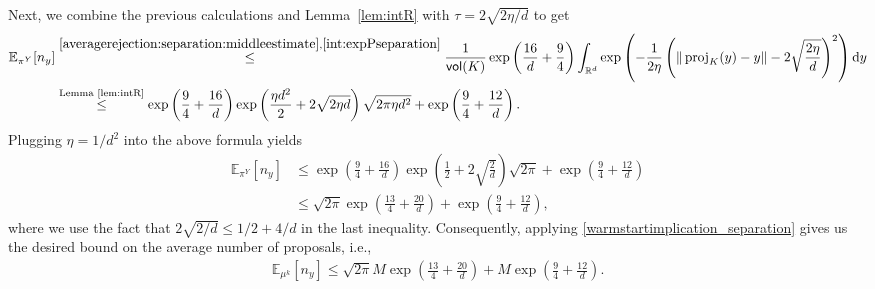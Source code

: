 \documentclass[11pt,letterpaper]{article}
\newcommand{\R}{\mathbb{R}}
\newcommand{\E}{\mathbb{E}}
\newcommand{\proj}{\operatorname{proj}}
\newcommand{\D}{\mathrm{d}}
\newcommand{\vol}{\mathsf{vol}}
\newcommand{\brac}[1]{\left( #1\right)}
\begin{document}
Next, we combine the previous calculations and Lemma~\ref{lem:intR} with $\tau=2\sqrt{2\eta/d}$ to get
\begin{align*}
     \E_{\pi^Y}[n_y]&\stackrel{\eqref{averagerejection:separation:middleestimate},      \eqref{int:expPseparation}}{\leq} \frac{1}{\vol(K)} \exp\brac{\frac{16}{d}+\frac{9}{4}}\int_{\R^d} \exp\left(-\frac{1}{2\eta}\brac{\|\proj_K(y)-y\|-2\sqrt{\frac{2\eta}{d}}}^2\right)\D y\\
     &\stackrel{\text{Lemma~\ref{lem:intR}}}{\le} \exp\brac{\frac{9}{4}+\frac{16}{d}} \exp\left(\frac{\eta d^2}{2}+2\sqrt{2\eta d}\right)\sqrt{2\pi \eta d^2}+\exp\brac{\frac{9}{4}+\frac{12}{d}}. 
\end{align*}
Plugging $\eta=1/d^2$ into the above formula yields
\begin{align*}
     \E_{\pi^Y}[n_y] &\le \exp\brac{\frac{9}{4}+\frac{16}{d}}\exp\brac{\frac{1}{2}+2\sqrt{\frac{2}{d}}}\sqrt{2\pi}+\exp\brac{\frac{9}{4}+\frac{12}{d}}\\
&\le \sqrt{2\pi} \exp\brac{\frac{13}{4}+\frac{20}{d}} + \exp\brac{\frac{9}{4}+\frac{12}{d}},
\end{align*}
where we use the fact that $2\sqrt{2/d} \le 1/2 + 4/d$ in the last inequality.
Consequently, applying \eqref{warmstartimplication_separation} gives us the desired bound on the average number of proposals, i.e.,
\begin{align*}
    \mathbb{E}_{\mu^k}[n_y]\leq \sqrt{2\pi} M\exp\brac{\frac{13}{4}+\frac{20}{d}} + M \exp\brac{\frac{9}{4}+\frac{12}{d}}. 
\end{align*}
\end{document}
